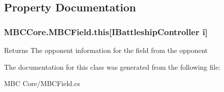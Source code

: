 \subsection{Property Documentation}
\hypertarget{class_m_b_c_core_1_1_m_b_c_field_a5f04fcac68dcf79554d87da90227fc3c}{
\subsubsection[{this[I\-Battleship\-Controller i]}]{ M\-B\-C\-Core.\-M\-B\-C\-Field.\-this\mbox{[}{\bf I\-Battleship\-Controller} i\mbox{]}\hspace{0.3cm}{\ttfamily [get]}}}\label{class_m_b_c_core_1_1_m_b_c_field_a5f04fcac68dcf79554d87da90227fc3c}
\begin{DoxyReturn}{Returns}
The opponent information for the field from the opponent
\end{DoxyReturn}


The documentation for this class was generated from the following file\-:\begin{DoxyCompactItemize}
\item 
M\-B\-C Core/M\-B\-C\-Field.\-cs\end{DoxyCompactItemize}
